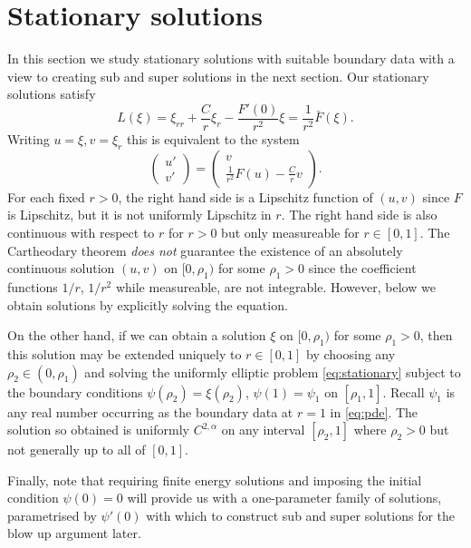 \documentclass{amsart}
\begin{document}
\section{Stationary solutions}
\label{sec:stationary}

In this section we study stationary solutions with suitable boundary data with a view to creating sub and super solutions in the next section. Our stationary solutions satisfy
\begin{equation}
\label{eq:stationary}
L(\xi) = \xi_{rr} + \frac{C}{r} \xi_r - \frac{F'(0)}{r^2} \xi = \frac{1}{r^2} \bar{F}(\xi).
\end{equation}
Writing \(u = \xi, v = \xi_r\) this is equivalent to the system
\[
\begin{pmatrix}
u' \\
v'
\end{pmatrix}
=
\begin{pmatrix}
v \\
\frac{1}{r^2} F(u) - \frac{C}{r} v
\end{pmatrix}.
\]
For each fixed \(r > 0\), the right hand side is a Lipschitz function of \((u,v)\) since \(F\) is Lipschitz, but it is not uniformly Lipschitz in \(r\). The right hand side is also continuous with respect to \(r\) for \(r > 0\) but only measureable for \(r \in [0, 1]\). The Cartheodary theorem \emph{does not} guarantee the existence of an absolutely continuous solution \((u, v)\) on \([0, \rho_1)\) for some  \(\rho_1 > 0\) since the coefficient functions \(1/r\), \(1/r^2\) while measureable, are not integrable. However, below we obtain solutions by explicitly solving the equation.

On the other hand, if we can obtain a solution \(\xi\) on \([0,\rho_1)\) for some \(\rho_1 > 0\), then this solution may be extended uniquely to \(r \in [0, 1]\) by choosing any \(\rho_2 \in (0, \rho_1)\) and solving the uniformly elliptic problem \eqref{eq:stationary} subject to the boundary conditions \(\psi(\rho_2) = \xi(\rho_2)\), \(\psi(1) = \psi_1\) on \([\rho_1, 1]\). Recall \(\psi_1\) is any real number occurring as the boundary data at \(r=1\) in \eqref{eq:pde}. The solution so obtained is uniformly \(C^{2,\alpha}\) on any interval \([\rho_2, 1]\) where \(\rho_2 > 0\) but not generally up to all of \([0, 1]\).

Finally, note that requiring finite energy solutions and imposing the initial condition \(\psi(0) = 0\) will provide us with a one-parameter family of solutions, parametrised by \(\psi'(0)\) with which to construct sub and super solutions for the blow up argument later.
\end{document}
